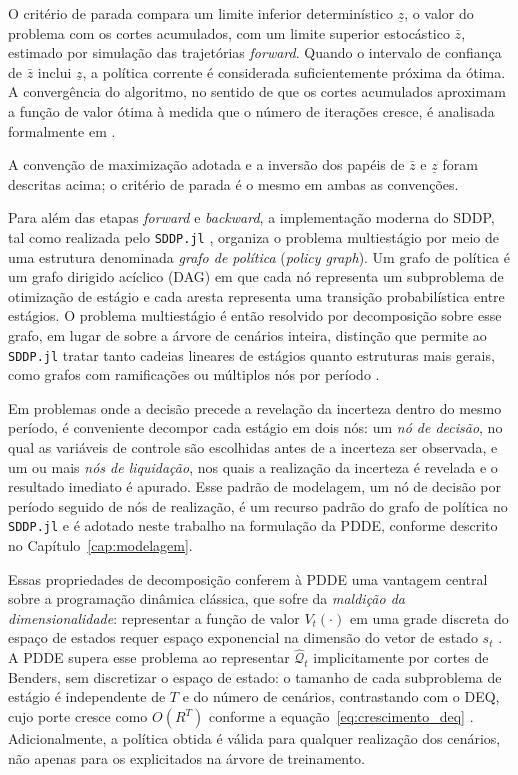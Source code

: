 O critério de parada compara um limite inferior determinístico $\underline{z}$, o valor do problema com os cortes acumulados, com um limite superior estocástico $\bar{z}$, estimado por simulação das trajetórias \emph{forward}. Quando o intervalo de confiança de $\bar{z}$ inclui $\underline{z}$, a política corrente é considerada suficientemente próxima da ótima. A convergência do algoritmo, no sentido de que os cortes acumulados aproximam a função de valor ótima à medida que o número de iterações cresce, é analisada formalmente em .

A convenção de maximização adotada e a inversão dos papéis de $\bar{z}$ e $\underline{z}$ foram descritas acima; o critério de parada é o mesmo em ambas as convenções.

Para além das etapas \textit{forward} e \textit{backward}, a implementação moderna do SDDP, tal como realizada pelo \texttt{SDDP.jl} \cite{dowson2021}, organiza o problema multiestágio por meio de uma estrutura denominada \emph{grafo de política} (\textit{policy graph}). Um grafo de política é um grafo dirigido acíclico (DAG) em que cada nó representa um subproblema de otimização de estágio e cada aresta representa uma transição probabilística entre estágios. O problema multiestágio é então resolvido por decomposição sobre esse grafo, em lugar de sobre a árvore de cenários inteira, distinção que permite ao \texttt{SDDP.jl} tratar tanto cadeias lineares de estágios quanto estruturas mais gerais, como grafos com ramificações ou múltiplos nós por período \cite{dowson2021}.

Em problemas onde a decisão precede a revelação da incerteza dentro do mesmo período, é conveniente decompor cada estágio em dois nós: um \emph{nó de decisão}, no qual as variáveis de controle são escolhidas antes de a incerteza ser observada, e um ou mais \emph{nós de liquidação}, nos quais a realização da incerteza é revelada e o resultado imediato é apurado. Esse padrão de modelagem, um nó de decisão por período seguido de nós de realização, é um recurso padrão do grafo de política no \texttt{SDDP.jl} e é adotado neste trabalho na formulação da PDDE, conforme descrito no Capítulo~\ref{cap:modelagem}.

Essas propriedades de decomposição conferem à PDDE uma vantagem central sobre a programação dinâmica clássica, que sofre da \emph{maldição da dimensionalidade}: representar a função de valor $V_t(\cdot)$ em uma grade discreta do espaço de estados requer espaço exponencial na dimensão do vetor de estado $s_t$ \cite{shapiro2009}. A PDDE supera esse problema ao representar $\hat{\mathcal{Q}}_t$ implicitamente por cortes de Benders, sem discretizar o espaço de estado: o tamanho de cada subproblema de estágio é independente de $T$ e do número de cenários, contrastando com o DEQ, cujo porte cresce como $O(R^T)$ conforme a equação~\eqref{eq:crescimento_deq} \cite{pereira1991}. Adicionalmente, a política obtida é válida para qualquer realização dos cenários, não apenas para os explicitados na árvore de treinamento.


